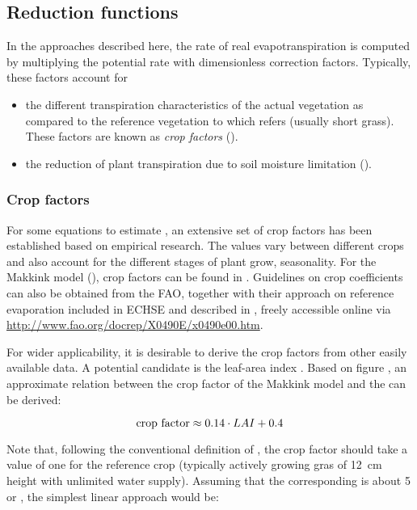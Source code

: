 \subsection{Reduction functions} \label{sec:eta:redfunc}

In the approaches described here, the rate of real evapotranspiration \etReal{} is computed by multiplying the potential rate \etPot{} with dimensionless correction factors. Typically, these factors account for
\begin{itemize}
  \item the different transpiration characteristics of the actual vegetation as compared to the reference vegetation to which \etPot{} refers (usually short grass). These factors are known as \emph{crop factors} ().
  \item the reduction of plant transpiration due to soil moisture limitation ().
\end{itemize}

\subsubsection{Crop factors} \label{sec:eta:cropfactors}

For some equations to estimate \etPot{}, an extensive set of crop factors has been established based on empirical research. The values vary between different crops and also account for the different stages of plant grow, \ie{} seasonality. For the Makkink model (), crop factors can be found in \citet{Feddes1987}. Guidelines on crop coefficients can also be obtained from the FAO, together with their approach on reference evaporation included in ECHSE and described in , freely accessible online via \url{http://www.fao.org/docrep/X0490E/x0490e00.htm}.

For wider applicability, it is desirable to derive the crop factors from other easily available data. A potential candidate is the leaf-area index \leafAreaIndex. Based on figure , an approximate relation between the crop factor of the Makkink model and the \leafAreaIndex{} can be derived:

\begin{equation} \label{eqn:eta:cropfactor-LAI}
  \text{crop factor} \approx 0.14 \cdot LAI + 0.4 
\end{equation}

Note that, following the conventional definition of \etPot{}, the crop factor should take a value of one for the reference crop (typically actively growing gras of 12~cm height with unlimited water supply). Assuming that the corresponding \leafAreaIndex{} is about 5 \citep[see, \eg][]{Misra1981} or \citep[][page 11]{Bremicker2006}, the simplest linear approach would be:

